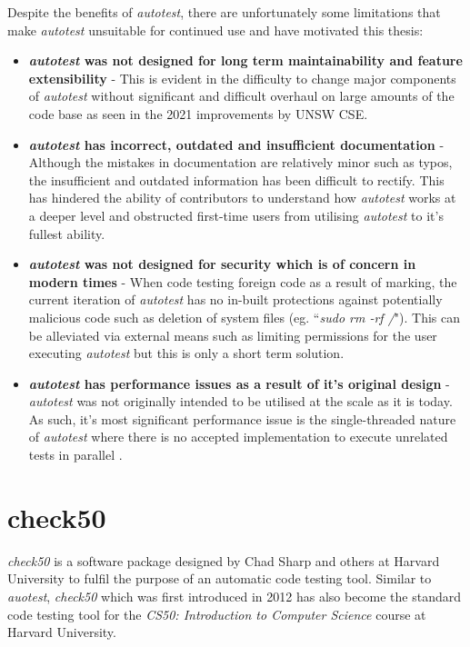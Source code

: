 \documentclass[hidelinks, 12pt]{extreport}
\begin{document}
Despite the benefits of \textit{autotest}, there are unfortunately some limitations that make \textit{autotest} unsuitable for continued use and have motivated this thesis:
\begin{itemize}
	\item \textbf{\textit{autotest} was not designed for long term maintainability and feature extensibility} - This is evident in the difficulty to change major components of \textit{autotest} without significant and difficult overhaul on large amounts of the code base as seen in the 2021 improvements by UNSW CSE.
	\item \textbf{\textit{autotest} has incorrect, outdated and insufficient documentation} - Although the mistakes in documentation are relatively minor such as typos, the insufficient and outdated information has been difficult to rectify. This has hindered the ability of contributors to understand how \textit{autotest} works at a deeper level and obstructed first-time users from utilising \textit{autotest} to it's fullest ability.
	\item \textbf{\textit{autotest} was not designed for security which is of concern in modern times} - When code testing foreign code as a result of marking, the current iteration of \textit{autotest} has no in-built protections against potentially malicious code such as deletion of system files (eg. ``\textit{sudo rm -rf /}"). This can be alleviated via external means such as limiting permissions for the user executing \textit{autotest} but this is only a short term solution.
	\item \textbf{\textit{autotest} has performance issues as a result of it's original design} - \textit{autotest} was not originally intended to be utilised at the scale as it is today. As such, it's most significant performance issue is the single-threaded nature of \textit{autotest} where there is no accepted implementation to execute unrelated tests in parallel \cite{AutotestParallelisation}.
\end{itemize}

\section{check50}

\textit{check50} is a software package designed by Chad Sharp and others at Harvard University to fulfil the purpose of an automatic code testing tool. Similar to \textit{auotest}, \textit{check50} which was first introduced in 2012 has also become the standard code testing tool for the \textit{CS50: Introduction to Computer Science} course at Harvard University.
\end{document}
